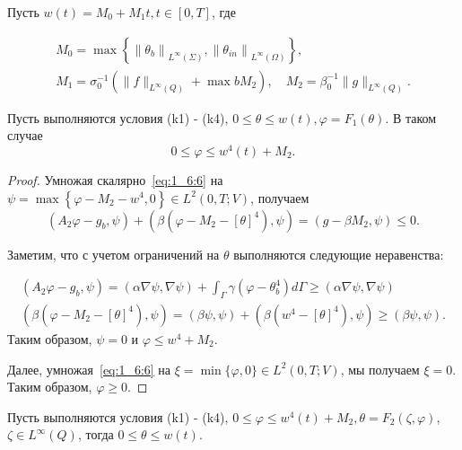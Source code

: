 Пусть $w(t)=M_{0}+M_{1} t, t \in[0, T]$, где

\[
    \begin{gathered}
        M_{0}=\max \left\{\left\|\theta_{b}\right\|_{L^{\infty}(\Sigma)},
        \left\|\theta_{i n}\right\|_{L^{\infty}(\Omega)}\right\}, \\
        M_{1}=\sigma_{0}^{-1}\left(\|f\|_{L^{\infty}(Q)}+\max b M_{2}\right),
        \quad M_{2}=\beta_{0}^{-1}\|g\|_{L^{\infty}(Q)}.
    \end{gathered}
\]

\begin{lemma}
    \label{lm:1_6:1}
    Пусть выполняются условия (k1) - (k4), $0 \leq \theta \leq w(t), \varphi=F_{1}(\theta)$.
    В таком случае
    \begin{equation}
        \label{eq:1_6:8}
        0 \leq \varphi \leq w^{4}(t)+M_2.
    \end{equation}
\end{lemma}

\begin{proof}
    Умножая скалярно~\eqref{eq:1_6:6} на
    $\psi=\max \left\{\varphi-M_{2}-w^{4}, 0\right\} \in L^{2}(0, T ; V)$,
    получаем
    \[
        \left(A_{2} \varphi-g_{b}, \psi\right)+\left(\beta\left(\varphi-M_{2}
        -[\theta]^{4}\right), \psi\right)=\left(g-\beta M_{2}, \psi\right) \leq 0.
    \]

    Заметим, что с учетом ограничений на $\theta$ выполняются следующие неравенства:

    \[
        \begin{gathered}
            \left(A_{2} \varphi-g_{b}, \psi\right)=(\alpha \nabla \psi, \nabla \psi)+\int_{\Gamma}
            \gamma\left(\varphi-\theta_{b}^{4}\right) d \Gamma \geq(\alpha \nabla \psi, \nabla \psi) \\
            \left(\beta\left(\varphi-M_{2}-[\theta]^{4}\right),
            \psi\right)=(\beta \psi, \psi)+\left(\beta\left(w^{4}
            -[\theta]^{4}\right), \psi\right) \geq(\beta \psi, \psi).
        \end{gathered}
    \]
    Таким образом, $\psi=0$ и $\varphi \leq w^{4}+M_{2}$.

    Далее, умножая~\eqref{eq:1_6:6} на $\xi=\min \{\varphi, 0\} \in L^{2}(0, T ; V)$,
    мы получаем $\xi=0$.
    Таким образом, $\varphi \geq 0$.
\end{proof}

\begin{lemma}
    \label{lm:1_6:2}
    Пусть выполняются условия (k1) - (k4),
    $0 \leq \varphi \leq w^{4}(t)+M_{2}, \theta=F_{2}(\zeta, \varphi)$,
    $\zeta \in L^{\infty}(Q)$, тогда $0 \leq \theta \leq w(t)$.
\end{lemma}

